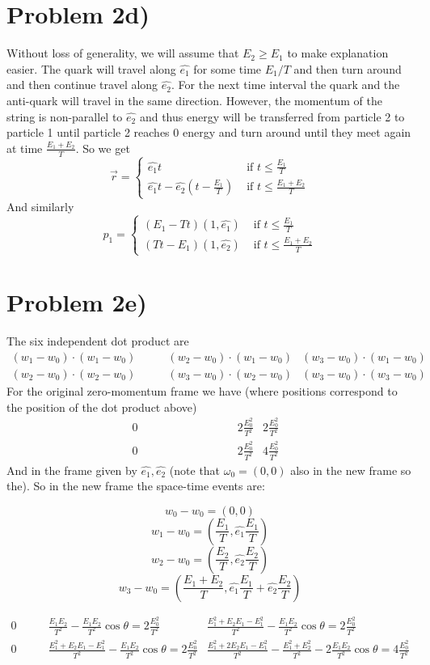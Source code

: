 \section*{Problem 2d)}
Without loss of generality, we will assume that $E_2\geq E_1$ to make explanation easier. 
The quark will travel along $\hat{e_1}$ for some time $E_1/T$ and then turn around and then continue travel along $\hat{e_2}$. For the next time interval the quark and the anti-quark will travel in the same direction. However, the momentum of the string is non-parallel to $\hat{e_2}$ and thus energy will be transferred from particle 2 to particle 1 until particle 2 reaches $0$ energy and turn around until they meet again at time $\frac{E_1+E_2}{T}$. So we get
\[ \vec{r} = \begin{cases} \hat{e_1} t & \mbox{ if } t\leq\frac{E_1}{T} \\
\hat{e_1} t - \hat{e_2} (t - \frac{E_1}{T}) & \mbox{ if } t\leq\frac{E_1+E_2}{T} \end{cases} \]
And similarly
\[ p_1 = \begin{cases} (E_1 - Tt)(1,\hat{e_1}) & \mbox{ if } t\leq\frac{E_1}{T} \\
 (Tt-E_1)(1,\hat{e_2}) & \mbox{ if } t\leq\frac{E_1+E_2}{T} \end{cases} \]
\section*{Problem 2e)}
The six independent dot product are
\begin{align}
(w_1-w_0)\cdot (w_1-w_0) & \qquad
(w_2-w_0)\cdot (w_1-w_0) &
(w_3-w_0)\cdot (w_1-w_0) &\\
(w_2-w_0)\cdot (w_2-w_0) &\qquad
(w_3-w_0)\cdot (w_2-w_0) &
(w_3-w_0)\cdot (w_3-w_0) &
\end{align}
For the original zero-momentum frame we have (where positions correspond to the position of the dot product above)
\begin{align}
0 & \qquad\qquad\qquad\qquad
2 \frac{E_0^2}{T^2} &
2 \frac{E_0^2}{T^2} &\\
0&\qquad\qquad\qquad\qquad
2 \frac{E_0^2}{T^2} &
4 \frac{E_0^2}{T^2} &
\end{align}
And in the frame given by $\hat{e_1},\hat{e_2}$ (note that $\omega_0=(0,0)$ also in the new frame so the). So in the new frame the space-time events are:
\begin{multicols}{2}
\noindent
\[ w_0-w_0 = (0,0) \]
\[ w_1-w_0 = \left(\frac{E_1}{T},\hat{e_1}\frac{E_1}{T}\right) \]
\[ w_2-w_0 = \left(\frac{E_2}{T},\hat{e_2}\frac{E_2}{T}\right) \]
\[ w_3-w_0 = \left(\frac{E_1+E_2}{T},\hat{e_1}\frac{E_1}{T}+\hat{e_2}\frac{E_2}{T}\right) \]
\end{multicols}
\begin{align}
0 & \qquad
\frac{E_1E_2}{T^2} - \frac{E_1E_2}{T^2}\cos\theta = 2\frac{E_0^2}{T^2} &
\frac{E_1^2+E_2E_1-E_1^2}{T^2} - \frac{E_1E_2}{T^2}\cos\theta = 2\frac{E_0^2}{T^2}   &\\
0&\qquad
\frac{E_1^2+E_2E_1-E_1^2}{T^2} - \frac{E_1E_2}{T^2}\cos\theta = 2\frac{E_0^2}{T^2} &
\frac{E_1^2+2E_2E_1-E_1^2}{T^2} - \frac{E_1^2+E_2^2}{T^2} - 2\frac{E_1E_2}{T^2}\cos\theta = 4\frac{E_0^2}{T^2} &
\end{align}

